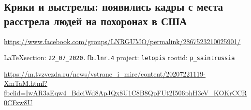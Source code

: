  
 
\subsection{Крики и выстрелы: появились кадры с места расстрела людей на похоронах в США}
\label{sec:22_07_2020.fb.lnr.4}
\url{https://www.facebook.com/groups/LNRGUMO/permalink/2867523210025901/}
  
\vspace{0.5cm}
{\small\LaTeX section: \verb|22_07_2020.fb.lnr.4| project: \verb|letopis| rootid: \verb|p_saintrussia|}
\vspace{0.5cm}

\url{https://m.tvzvezda.ru/news/vstrane_i_mire/content/20207221119-XmTaM.html?fbclid=IwAR3aEqw4_BdciWd8ApJQx8U1C8B8QpFUt2I506phH3eV_KOKrCCR0CFzw8U}
  
